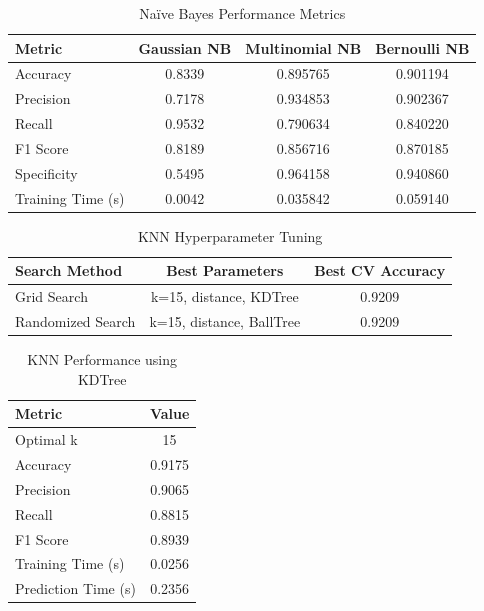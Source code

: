 \documentclass[11pt]{article}
\begin{document}
\begin{table}[H]
\centering
\caption{Naïve Bayes Performance Metrics}
\begin{tabular}{|l|c|c|c|}
\hline
\textbf{Metric} & \textbf{Gaussian NB} & \textbf{Multinomial NB} & \textbf{Bernoulli NB} \\ \hline
Accuracy & 0.8339 & 0.895765 & 0.901194     \\ \hline
Precision & 0.7178 & 0.934853 & 0.902367   \\ \hline
Recall & 0.9532 & 0.790634 &0.840220   \\ \hline
F1 Score & 0.8189 & 0.856716 & 0.870185     \\ \hline
Specificity & 0.5495 & 0.964158& 0.940860 \\ \hline
Training Time (s) & 0.0042 & 0.035842  & 0.059140 \\ \hline
\end{tabular}
\end{table}

\begin{table}[H]
\centering
\caption{KNN Hyperparameter Tuning}
\begin{tabular}{|l|c|c|}
\hline
\textbf{Search Method} & \textbf{Best Parameters} & \textbf{Best CV Accuracy} \\ \hline
Grid Search & k=15, distance, KDTree & 0.9209 \\ \hline
Randomized Search & k=15, distance, BallTree & 0.9209 \\ \hline
\end{tabular}
\end{table}

\begin{table}[H]
\centering
\caption{KNN Performance using KDTree}
\begin{tabular}{|l|c|}
\hline
\textbf{Metric} & \textbf{Value} \\ \hline
Optimal k & 15 \\ \hline
Accuracy & 0.9175 \\ \hline
Precision & 0.9065 \\ \hline
Recall & 0.8815 \\ \hline
F1 Score & 0.8939 \\ \hline
Training Time (s) & 0.0256 \\ \hline
Prediction Time (s) & 0.2356 \\ \hline
\end{tabular}
\end{table}
\end{document}

